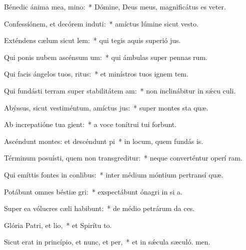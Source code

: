 \item Bénedic ánima mea, mino:~* Dómine, Deus meus, magnificátus es veter.
\item Confessiónem, et decórem induti:~* amíctus lúmine sicut vesto.
\item Exténdens cælum sicut lem:~* qui tegis aquis superió jus.
\item Qui ponis nubem ascénsum um:~* qui ámbulas super pennas rum.
\item Qui facis ángelos tuos, ritus:~* et minístros tuos ignem tem.
\item Qui fundásti terram super stabilitátem am:~* non inclinábitur in sǽcu culi.
\item Abýssus, sicut vestiméntum, amíctus jus:~* super montes sta quæ.
\item Ab increpatióne tua gient:~* a voce tonítrui tui forbunt.
\item Ascéndunt montes: et descéndunt pi~* in locum, quem fundás is.
\item Términum posuísti, quem non transgreditur:~* neque converténtur operí ram.
\item Qui emíttis fontes in conlibus:~* inter médium móntium pertransí quæ.
\item Potábunt omnes béstiæ gri:~* exspectábunt ónagri in si a.
\item Super ea vólucres cæli habibunt:~* de médio petrárum da ces.
\item Glória Patri, et lio,~* et Spirítu to.
\item Sicut erat in princípio, et nunc, et per,~* et in sǽcula sæculó. men.
